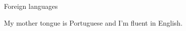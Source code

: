 \begin {rubric} {Foreign languages}

\entry* My mother tongue is Portuguese and I'm fluent in English.

\end{rubric}
